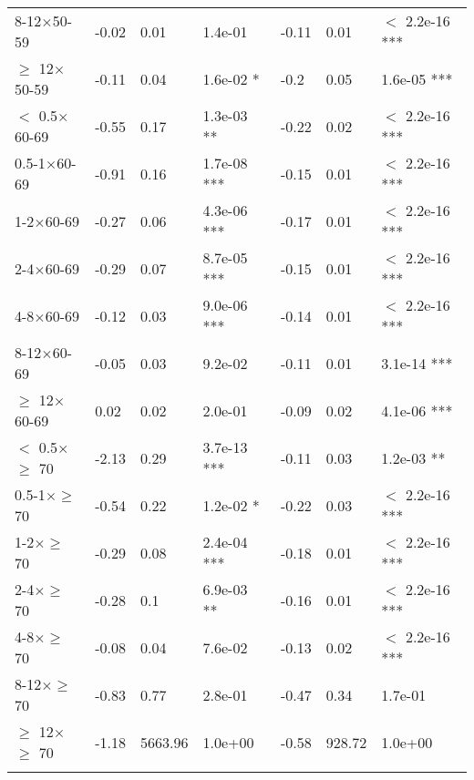 \documentclass{article}\usepackage[utf8]{inputenc}
\begin{document}
\begin{longtable}[t]{lllllll}
\hspace{1em}8-12$\times$50-59 & -0.02 & 0.01 & 1.4e-01 & -0.11 & 0.01 & $<$ 2.2e-16 ***\\
\hspace{1em}$\geq$ 12$\times$50-59 & -0.11 & 0.04 & 1.6e-02 * & -0.2 & 0.05 & 1.6e-05 ***\\
\hspace{1em}$<$ 0.5$\times$60-69 & -0.55 & 0.17 & 1.3e-03 ** & -0.22 & 0.02 & $<$ 2.2e-16 ***\\
\hspace{1em}0.5-1$\times$60-69 & -0.91 & 0.16 & 1.7e-08 *** & -0.15 & 0.01 & $<$ 2.2e-16 ***\\
\hspace{1em}1-2$\times$60-69 & -0.27 & 0.06 & 4.3e-06 *** & -0.17 & 0.01 & $<$ 2.2e-16 ***\\
\hspace{1em}2-4$\times$60-69 & -0.29 & 0.07 & 8.7e-05 *** & -0.15 & 0.01 & $<$ 2.2e-16 ***\\
\hspace{1em}4-8$\times$60-69 & -0.12 & 0.03 & 9.0e-06 *** & -0.14 & 0.01 & $<$ 2.2e-16 ***\\
\hspace{1em}8-12$\times$60-69 & -0.05 & 0.03 & 9.2e-02 & -0.11 & 0.01 & 3.1e-14 ***\\
\hspace{1em}$\geq$ 12$\times$60-69 & 0.02 & 0.02 & 2.0e-01 & -0.09 & 0.02 & 4.1e-06 ***\\
\hspace{1em}$<$ 0.5$\times$$\geq$ 70 & -2.13 & 0.29 & 3.7e-13 *** & -0.11 & 0.03 & 1.2e-03 **\\
\hspace{1em}0.5-1$\times$$\geq$ 70 & -0.54 & 0.22 & 1.2e-02 * & -0.22 & 0.03 & $<$ 2.2e-16 ***\\
\hspace{1em}1-2$\times$$\geq$ 70 & -0.29 & 0.08 & 2.4e-04 *** & -0.18 & 0.01 & $<$ 2.2e-16 ***\\
\hspace{1em}2-4$\times$$\geq$ 70 & -0.28 & 0.1 & 6.9e-03 ** & -0.16 & 0.01 & $<$ 2.2e-16 ***\\
\hspace{1em}4-8$\times$$\geq$ 70 & -0.08 & 0.04 & 7.6e-02 & -0.13 & 0.02 & $<$ 2.2e-16 ***\\
\hspace{1em}8-12$\times$$\geq$ 70 & -0.83 & 0.77 & 2.8e-01 & -0.47 & 0.34 & 1.7e-01\\
\hspace{1em}$\geq$ 12$\times$$\geq$ 70 & -1.18 & 5663.96 & 1.0e+00 & -0.58 & 928.72 & 1.0e+00\\
$$
\end{longtable}
\end{document}

